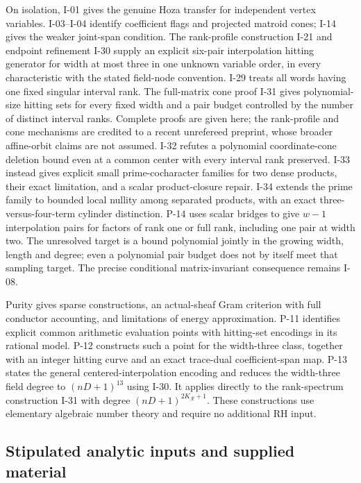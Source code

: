 \documentclass[11pt,a4paper]{article}
\theoremstyle{definition}\newtheorem{definition}{Definition}
\begin{document}
On isolation, I-01 gives the genuine Hoza transfer for independent vertex variables. I-03--I-04 identify coefficient flags and projected matroid cones; I-14 gives the weaker joint-span condition. The rank-profile construction I-21 and endpoint refinement I-30 supply an explicit six-pair interpolation hitting generator for width at most three in one unknown variable order, in every characteristic with the stated field-node convention. I-29 treats all words having one fixed singular interval rank. The full-matrix cone proof I-31 gives polynomial-size hitting sets for every fixed width and a pair budget controlled by the number of distinct interval ranks. Complete proofs are given here; the rank-profile and cone mechanisms are credited to a recent unrefereed preprint, whose broader affine-orbit claims are not assumed. I-32 refutes a polynomial coordinate-cone deletion bound even at a common center with every interval rank preserved. I-33 instead gives explicit small prime-cocharacter families for two dense products, their exact limitation, and a scalar product-closure repair. I-34 extends the prime family to bounded local nullity among separated products, with an exact three-versus-four-term cylinder distinction. P-14 uses scalar bridges to give $w-1$ interpolation pairs for factors of rank one or full rank, including one pair at width two. The unresolved target is a bound polynomial jointly in the growing width, length and degree; even a polynomial pair budget does not by itself meet that sampling target. The precise conditional matrix-invariant consequence remains I-08.

Purity gives sparse constructions, an actual-sheaf Gram criterion with full conductor accounting, and limitations of energy approximation. P-11 identifies explicit common arithmetic evaluation points with hitting-set encodings in its rational model. P-12 constructs such a point for the width-three class, together with an integer hitting curve and an exact trace-dual coefficient-span map. P-13 states the general centered-interpolation encoding and reduces the width-three field degree to $(nD+1)^{13}$ using I-30. It applies directly to the rank-spectrum construction I-31 with degree $(nD+1)^{2K_{\mathcal R}+1}$. These constructions use elementary algebraic number theory and require no additional RH input.

\subsection{Stipulated analytic inputs and supplied material}
\end{document}
